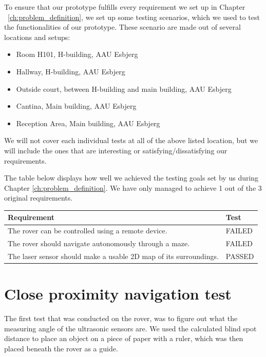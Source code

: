 To ensure that our prototype fulfills every requirement we set up in Chapter ~\ref{ch:problem_definition}, we set up some testing scenarios, which we used to test the functionalities of our prototype. These scenario are made out of several locations and setups:
\begin{itemize}
	\item Room H101, H-building, AAU Esbjerg
	\item Hallway, H-building, AAU Esbjerg
	\item Outside court, between H-building and main building, AAU Esbjerg
	\item Cantina, Main building, AAU Esbjerg
	\item Reception Area, Main building, AAU Esbjerg
\end{itemize}

We will not cover each individual tests at all of the above listed location, but we will include the ones that are interesting or satisfying/dissatisfying our requirements.

The table below displays how well we achieved the testing goals set by us during Chapter \ref{ch:problem_definition}. We have only managed to achieve 1 out of the 3 original requirements.

\begin{table}[H]
	\centering
	\begin{tabular}{|l|l|}
		\hline
		\textbf{Requirement} & \textbf{Test} \\ \hline
		The rover can be controlled using a remote device. & FAILED \\ \hline
		The rover should navigate autonomously through a maze. & FAILED \\ \hline
		The laser sensor should make a usable 2D map of its surroundings. & PASSED\\ \hline
	\end{tabular}
\end{table}

\clearpage
\section{Close proximity navigation test}

The first test that was conducted on the rover, was to figure out what the measuring angle of the ultrasonic sensors are. We used the calculated blind spot distance to place an object on a piece of paper with a ruler, which was then placed beneath the rover as a guide.

